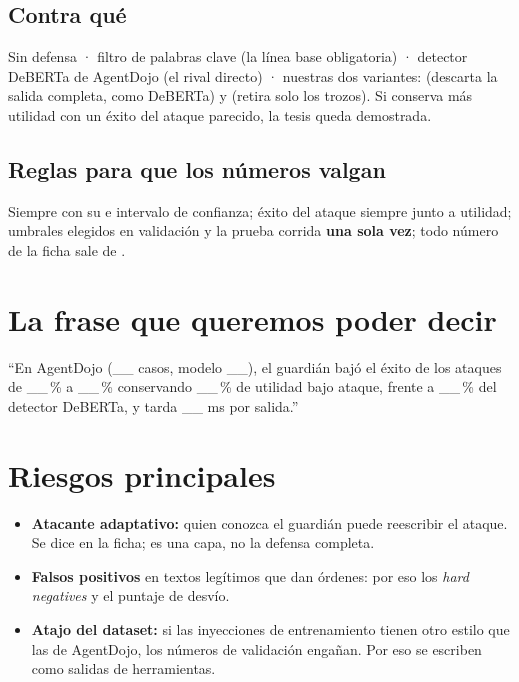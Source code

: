 \subsection*{Contra qué}
Sin defensa · filtro de palabras clave (la línea base obligatoria) · detector DeBERTa de AgentDojo (el rival directo) · nuestras dos variantes:  (descarta la salida completa, como DeBERTa) y  (retira solo los trozos). Si  conserva más utilidad con un éxito del ataque parecido, la tesis queda demostrada.

\subsection*{Reglas para que los números valgan}
Siempre con su  e intervalo de confianza; éxito del ataque siempre junto a utilidad; umbrales elegidos en validación y la prueba corrida \textbf{una sola vez}; todo número de la ficha sale de .

\section{La frase que queremos poder decir}
\begin{callout}[algo]
“En AgentDojo (\_\_ casos, modelo \_\_), el guardián bajó el éxito de los ataques de \_\_\,\% a \_\_\,\% conservando \_\_\,\% de utilidad bajo ataque, frente a \_\_\,\% del detector DeBERTa, y tarda \_\_ ms por salida.”
\end{callout}

\section{Riesgos principales}
\begin{itemize}
  \item \textbf{Atacante adaptativo:} quien conozca el guardián puede reescribir el ataque. Se dice en la ficha; es una capa, no la defensa completa.
  \item \textbf{Falsos positivos} en textos legítimos que dan órdenes: por eso los \emph{hard negatives} y el puntaje de desvío.
  \item \textbf{Atajo del dataset:} si las inyecciones de entrenamiento tienen otro estilo que las de AgentDojo, los números de validación engañan. Por eso se escriben como salidas de herramientas.
\end{itemize}
